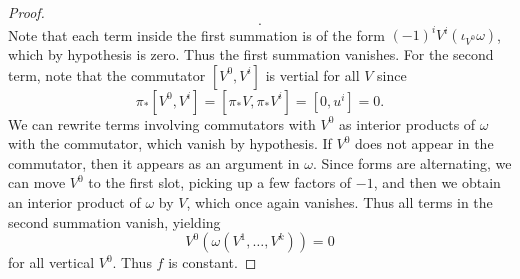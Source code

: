 \documentclass[10pt, letterpaper]{article}
\begin{document}
\begin{proof}
\[	.\]
	Note that each term inside the first summation is of the form $(-1)^iV^i(\iota _{V^0} \omega )$, which by hypothesis is zero. Thus the first summation vanishes. For the second term, note that the commutator $[V^0,V^i]$ is vertial for all $V$ since
	\[
		\pi _*[V^0,V^i]=[\pi _*V,\pi _*V^i]=[0,u^i]=0
	.\]
	We can rewrite terms involving commutators with $V^0$ as interior products of $\omega $ with the commutator, which vanish by hypothesis. If $V^0$ does not appear in the commutator, then it appears as an argument in $\omega $. Since forms are alternating, we can move $V^0$ to the first slot, picking up a few factors of $-1$, and then we obtain an interior product of $\omega $ by $V$, which once again vanishes. Thus all terms in the second summation vanish, yielding
	\[
		V^0(\omega (V^1, \ldots ,V^k))=0
	\]
	for all vertical $V^0$. Thus $f$ is constant.
\end{proof}
\end{document}
